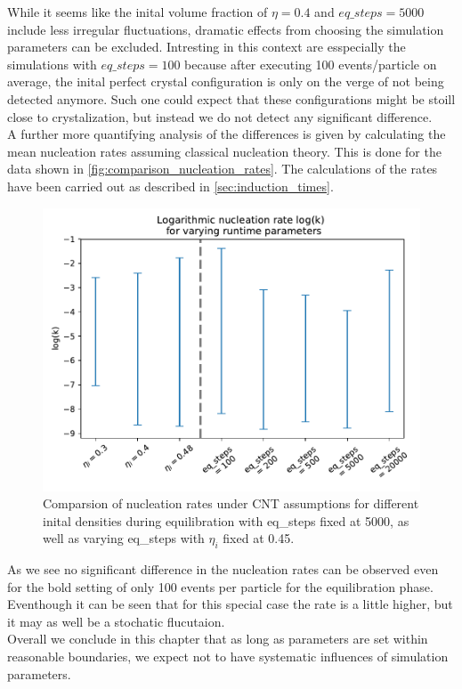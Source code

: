 While it seems like the inital volume fraction of $\eta=0.4$ and $eq\_steps = 5000$ include less irregular fluctuations, dramatic effects from choosing the simulation parameters can be excluded. Intresting in this context are esspecially the simulations with $eq\_steps = 100$ because after executing 100 events/particle on average, the inital perfect crystal configuration is only on the verge of not being detected anymore. Such one could expect that these configurations might be stoill close to crystalization, but instead we do not detect any significant difference.\\

A further more quantifying analysis of the differences is given by calculating the mean nucleation rates assuming classical nucleation theory. This is done for the data shown in \autoref{fig:comparison_nucleation_rates}. The calculations of the rates have been carried out as described in \autoref{sec:induction_times}.

\begin{figure}[h!]
\centering
\includegraphics[width=0.7 \linewidth]{../plots/nucleation_rate_comparison.pdf}
\caption{Comparsion of nucleation rates under CNT assumptions for different inital densities during equilibration with eq\_steps fixed at 5000, as well as varying eq\_steps with $\eta_i$ fixed at 0.45. }
\label{fig:comparison_nucleation_rates}
\end{figure}

As we see no significant difference in the nucleation rates can be observed even for the bold setting of only 100 events per particle for the equilibration phase. Eventhough it can be seen that for this special case the rate is a little higher, but it may as well be a stochatic flucutaion.\\

Overall we conclude in this chapter that as long as parameters are set within reasonable boundaries, we expect not to have systematic influences of simulation parameters. 


